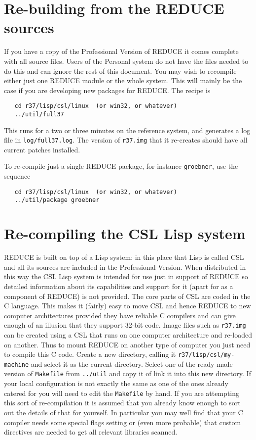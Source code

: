 \documentclass[a4paper,11pt]{article}
\begin{document}
\section{Re-building from the REDUCE sources}
If you have a copy of the Professional Version of REDUCE it comes complete
with all source files. Users of the Personal system do not have the files
needed to do this and can ignore the rest of this document.
You may wish to recompile either just one REDUCE
module or the whole system. This will mainly be the case if you are
developing new packages for REDUCE.  The recipe is
\begin{verbatim}
   cd r37/lisp/csl/linux  (or win32, or whatever)
   ../util/full37
\end{verbatim}
\noindent This runs for a two or three minutes on the reference system,
and generates a log file in \verb+log/full37.log+. The version of
\verb+r37.img+ that it re-creates should have all current patches
installed.

To re-compile just a single REDUCE package, for instance \verb.groebner.,
use the sequence
\begin{verbatim}
   cd r37/lisp/csl/linux  (or win32, or whatever)
   ../util/package groebner
\end{verbatim}


\section{Re-compiling the CSL Lisp system}
REDUCE is built on top of a Lisp system: in this place that Lisp is called
CSL and all its sources are included in the Professional Version. When
distributed in this way the CSL Lisp system is intended for use just in
support of REDUCE so detailed information about its capabilities and
support for it (apart for as a component of REDUCE) is not provided.
The core parts of CSL are coded in the C language. This makes it
(fairly) easy to move CSL and hence REDUCE to new computer architectures
provided they have reliable C compilers and can give enough of an illusion
that they support 32-bit code.  Image files such as \verb+r37.img+ can be
created using a CSL that runs on one computer architecture and re-loaded
on another. Thus to mount REDUCE on another type of computer you just need
to compile this C code.  Create a new directory, calling it
\verb+r37/lisp/csl/my-machine+ and select it as the current directory.
Select one of the ready-made version of  \verb+Makefile+ from
\verb+../util+ and copy it of link it into this new directory. If your
local configuration is not exactly the same as one of the ones already catered
for you will need to edit the \verb+Makefile+ by hand. If you are attempting
this sort of re-compilation it is assumed that you already know enough to
sort out the details of that for yourself. In particular you may well find
that your C compiler needs some special flags setting or (even more probable)
that custom directives are needed to get all relevant libraries scanned.
\end{document}
